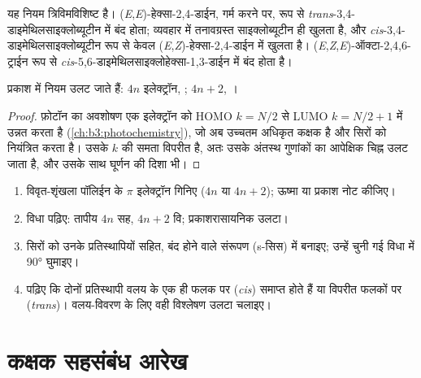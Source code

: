 यह नियम त्रिविमविशिष्ट है। (\textit{E},\textit{E})-हेक्सा-2,4-डाईन, गर्म करने पर,
 रूप से \textit{trans}-3,4-डाइमेथिलसाइक्लोब्यूटीन में बंद होता; व्यवहार में तनावग्रस्त
साइक्लोब्यूटीन ही खुलता है, और \textit{cis}-3,4-डाइमेथिलसाइक्लोब्यूटीन
 रूप से केवल (\textit{E},\textit{Z})-हेक्सा-2,4-डाईन में खुलता है। (\textit{E},\textit{Z},\textit{E})-ऑक्टा-2,4,6-ट्राईन
 रूप से \textit{cis}-5,6-डाइमेथिलसाइक्लोहेक्सा-1,3-डाईन में बंद होता है।

\begin{proposition}[प्रकाशरासायनिक विद्युतचक्रीय अभिक्रियाएँ]\label{prop:b3:pericyclic:photo-electrocyclic}
प्रकाश में नियम उलट जाते हैं: $4n$ इलेक्ट्रॉन, ; $4n + 2$, ।
\end{proposition}

\begin{proof}
फ़ोटॉन का अवशोषण एक इलेक्ट्रॉन को HOMO $k = N/2$ से LUMO $k = N/2 + 1$ में उन्नत करता है
(\cref{ch:b3:photochemistry}), जो अब उच्चतम अधिकृत कक्षक है और
सिरों को नियंत्रित करता है। उसके $k$ की समता विपरीत है, अतः उसके
अंतस्थ गुणांकों का आपेक्षिक चिह्न उलट जाता है, और उसके साथ घूर्णन की दिशा भी।
\end{proof}

\begin{method}[विद्युतचक्रीय अभिक्रिया के त्रिविम रसायन का पूर्वानुमान]\label{met:b3:pericyclic:predict-stereo}
\begin{enumerate}
  \item विवृत-शृंखला पॉलिईन के $\pi$ इलेक्ट्रॉन गिनिए ($4n$ या $4n + 2$); ऊष्मा या
        प्रकाश नोट कीजिए।
  \item विधा पढ़िए: तापीय $4n$ सह, $4n + 2$ वि; प्रकाशरासायनिक उलटा।
  \item सिरों को उनके प्रतिस्थापियों सहित, बंद होने वाले संरूपण (s-सिस) में
        बनाइए; उन्हें चुनी गई विधा में 90° घुमाइए।
  \item पढ़िए कि दोनों प्रतिस्थापी वलय के एक ही फलक पर
        (\textit{cis}) समाप्त होते हैं या विपरीत फलकों पर (\textit{trans})। वलय-विवरण के लिए वही
        विश्लेषण उलटा चलाइए।
\end{enumerate}
\end{method}

\section{कक्षक सहसंबंध आरेख}

